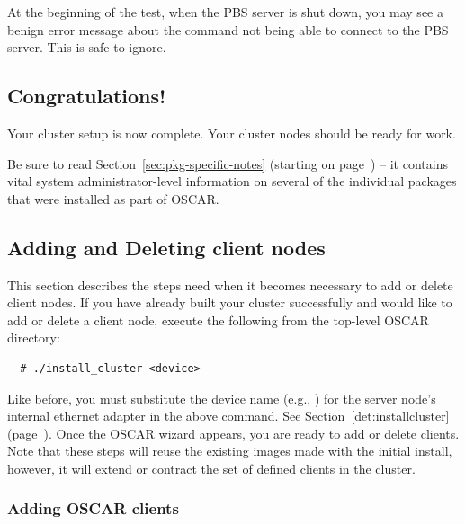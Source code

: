At the beginning of the test, when the PBS server is shut down, you
may see a benign error message about the  command not
being able to connect to the PBS server.  This is safe to ignore.


\subsection{Congratulations!}

Your cluster setup is now complete. Your cluster nodes should
be ready for work.

Be sure to read Section~\ref{sec:pkg-specific-notes} (starting on
page~\pageref{sec:pkg-specific-notes}) -- it contains vital system
administrator-level information on several of the individual packages
that were installed as part of OSCAR.


\subsection{Adding and Deleting client nodes}

This section describes the steps need when it becomes necessary to add
or delete client nodes. If you have already built your cluster
successfully and would like to add or delete a client node, execute
the following from the top-level OSCAR directory:

\begin{verbatim}
  # ./install_cluster <device>
\end{verbatim}

Like before, you must substitute the device name (e.g., )
for the server node's internal ethernet adapter in the above command.
See Section~\ref{det:installcluster}
(page~\pageref{det:installcluster}). Once the OSCAR wizard appears,
you are ready to add or delete clients. Note that these steps will
reuse the existing images made with the initial install, however, it
will extend or contract the set of defined clients in the cluster.


\subsubsection{Adding OSCAR clients}
\label{det:adding-clients}

